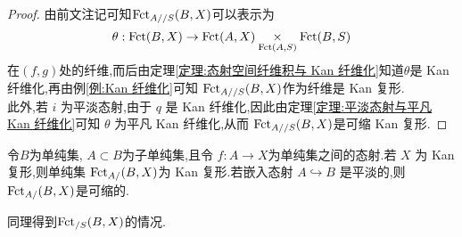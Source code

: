 \begin{proof}
    由前文注记可知$\operatorname{Fct}_{A//S}(B,X)$可以表示为
    \[\theta :\operatorname{Fct}(B,X) \to \operatorname{Fct}(A,X) \underset{\operatorname{Fct}(A,S)}{\times}\operatorname{Fct}(B,S)\]
    在$(f,g)$处的纤维,而后由定理\ref{定理:态射空间纤维积与 Kan 纤维化}知道$\theta$是 Kan 纤维化,再由例\ref{例:Kan 纤维化}可知 $\operatorname{Fct}_{A//S}(B,X)$作为纤维是 Kan 复形.\\
    此外,若 $i$ 为平淡态射,由于 $q$ 是 Kan 纤维化,因此由定理\ref{定理:平淡态射与平凡 Kan 纤维化}可知 $\theta$ 为平凡 Kan 纤维化,从而 $\operatorname{Fct}_{A//S}(B,X)$是可缩 Kan 复形.
\end{proof}
\begin{corollary}
    令$B$为单纯集, $A \subset B$为子单纯集,且令 $f: A \to X$为单纯集之间的态射.若 $X$ 为 Kan 复形,则单纯集 $\operatorname{Fct}_{A/}(B,X)$为 Kan 复形.若嵌入态射 $A \hookrightarrow B$ 是平淡的,则 $\operatorname{Fct}_{A/}(B,X)$是可缩的.
\end{corollary}
同理得到$\operatorname{Fct}_{/S}(B,X)$的情况.

